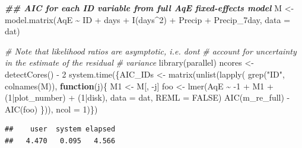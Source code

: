 \documentclass[
  ignorenonframetext,
]{beamer}
\newenvironment{Shaded}{\begin{snugshade}}{\end{snugshade}}
\newcommand{\AttributeTok}[1]{\textcolor[rgb]{0.77,0.63,0.00}{#1}}
\newcommand{\CommentTok}[1]{\textcolor[rgb]{0.56,0.35,0.01}{\textit{#1}}}
\newcommand{\ConstantTok}[1]{\textcolor[rgb]{0.00,0.00,0.00}{#1}}
\newcommand{\ControlFlowTok}[1]{\textcolor[rgb]{0.13,0.29,0.53}{\textbf{#1}}}
\newcommand{\DecValTok}[1]{\textcolor[rgb]{0.00,0.00,0.81}{#1}}
\newcommand{\DocumentationTok}[1]{\textcolor[rgb]{0.56,0.35,0.01}{\textbf{\textit{#1}}}}
\newcommand{\FunctionTok}[1]{\textcolor[rgb]{0.00,0.00,0.00}{#1}}
\newcommand{\NormalTok}[1]{#1}
\newcommand{\OtherTok}[1]{\textcolor[rgb]{0.56,0.35,0.01}{#1}}
\newcommand{\SpecialCharTok}[1]{\textcolor[rgb]{0.00,0.00,0.00}{#1}}
\newcommand{\StringTok}[1]{\textcolor[rgb]{0.31,0.60,0.02}{#1}}
\begin{document}
\begin{frame}[fragile]{}
\protect\hypertarget{section-19}{}
\small

\begin{Shaded}
\begin{Highlighting}[]
\DocumentationTok{\#\# AIC for each ID variable from full AqE fixed{-}effects model}
\NormalTok{M }\OtherTok{\textless{}{-}} \FunctionTok{model.matrix}\NormalTok{(AqE }\SpecialCharTok{\textasciitilde{}}\NormalTok{ ID }\SpecialCharTok{+}\NormalTok{ days }\SpecialCharTok{+} \FunctionTok{I}\NormalTok{(days}\SpecialCharTok{\^{}}\DecValTok{2}\NormalTok{) }\SpecialCharTok{+}\NormalTok{ Precip }\SpecialCharTok{+} 
\NormalTok{                    Precip\_7day, }\AttributeTok{data =}\NormalTok{ dat)}

\CommentTok{\# Note that likelihood ratios are asymptotic, i.e. don\textquotesingle{}t }
\CommentTok{\# account for uncertainty in the estimate of the residual }
\CommentTok{\# variance}
\FunctionTok{library}\NormalTok{(parallel)}
\NormalTok{ncores }\OtherTok{\textless{}{-}} \FunctionTok{detectCores}\NormalTok{() }\SpecialCharTok{{-}} \DecValTok{2}
\FunctionTok{system.time}\NormalTok{(\{AIC\_IDs }\OtherTok{\textless{}{-}} \FunctionTok{matrix}\NormalTok{(}\FunctionTok{unlist}\NormalTok{(}\FunctionTok{lapply}\NormalTok{(}
    \FunctionTok{grep}\NormalTok{(}\StringTok{"ID"}\NormalTok{, }\FunctionTok{colnames}\NormalTok{(M)), }\ControlFlowTok{function}\NormalTok{(j)\{}
\NormalTok{    M1 }\OtherTok{\textless{}{-}}\NormalTok{ M[, }\SpecialCharTok{{-}}\NormalTok{j]   }
\NormalTok{    foo }\OtherTok{\textless{}{-}} \FunctionTok{lmer}\NormalTok{(AqE }\SpecialCharTok{\textasciitilde{}} \SpecialCharTok{{-}}\DecValTok{1} \SpecialCharTok{+}\NormalTok{ M1 }\SpecialCharTok{+}\NormalTok{ (}\DecValTok{1}\SpecialCharTok{|}\NormalTok{plot\_number) }\SpecialCharTok{+}\NormalTok{ (}\DecValTok{1}\SpecialCharTok{|}\NormalTok{disk), }
                            \AttributeTok{data =}\NormalTok{ dat, }\AttributeTok{REML =} \ConstantTok{FALSE}\NormalTok{)}
    \FunctionTok{AIC}\NormalTok{(m\_re\_full) }\SpecialCharTok{{-}} \FunctionTok{AIC}\NormalTok{(foo) }
\NormalTok{\})), }\AttributeTok{ncol =} \DecValTok{1}\NormalTok{)\})}
\end{Highlighting}
\end{Shaded}

\begin{verbatim}
##    user  system elapsed 
##   4.470   0.095   4.566
\end{verbatim}
\end{frame}
\end{document}
